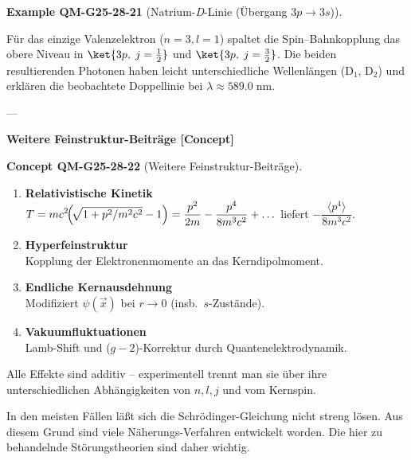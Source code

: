 \documentclass[10pt, letterpaper]{article}
\newcommand{\CustomHeading}[3]{%
  \par\medskip\noindent%
  \textbf{#1 #2} \textnormal{(#3)}.\enskip%
}
\newenvironment{EXA}[2]{\begin{unitbox}\CustomHeading{Example}{#1}{#2}}{\end{unitbox}}
\newenvironment{CONC}[2]{\begin{unitbox}\CustomHeading{Concept}{#1}{#2}}{\end{unitbox}}
\begin{document}
\begin{EXA}{QM-G25-28-21}{Natrium-\emph{D}-Linie (Übergang $3p\!\to\!3s$)}
Für das einzige Valenzelektron ($n{=}3,l{=}1$) spaltet die Spin–Bahnkopplung das
obere Niveau in  
\(\ket{3p,\;j=\tfrac12}\) und \(\ket{3p,\;j=\tfrac32}\).
Die beiden resultierenden Photonen haben leicht unterschiedliche
Wellenlängen (D$_1$, D$_2$) und erklären die beobachtete Doppellinie
bei \(\lambda\approx\!589.0\;\text{nm}\).
\end{EXA}

---

\textbf{Weitere Feinstruktur-Beiträge [Concept]}

\begin{CONC}{QM-G25-28-22}{Weitere Feinstruktur-Beiträge}
\begin{enumerate}
\item \textbf{Relativistische Kinetik}\\
      \(\displaystyle
      T = mc^{2}\!\Bigl(\!\sqrt{1+p^{2}/m^{2}c^{2}}-1\Bigr)
      = \frac{p^{2}}{2m}-\frac{p^{4}}{8m^{3}c^{2}}+\dots
      \)
      liefert $-\dfrac{\langle p^{4}\rangle}{8m^{3}c^{2}}$.
\item \textbf{Hyperfeinstruktur}\\
      Kopplung der Elektronenmomente an das Kerndipolmoment.
\item \textbf{Endliche Kernausdehnung}\\
      Modifiziert $\psi(\vec x)$ bei $r\!\to\!0$ (insb.\ $s$-Zustände).
\item \textbf{Vakuumfluktuationen}\\
      Lamb-Shift und (\(g{-}2\))-Korrektur durch Quantenelektrodynamik.
\end{enumerate}

Alle Effekte sind additiv – experimentell trennt man sie über ihre
unterschiedlichen Abhängigkeiten von $n,l,j$ und vom Kernspin.
\end{CONC}












In den meisten Fällen läßt sich die Schrödinger-Gleichung nicht streng lösen. Aus diesem Grund sind viele Näherungs-Verfahren entwickelt worden. Die hier zu behandelnde Störungstheorien sind daher wichtig.
\end{document}
